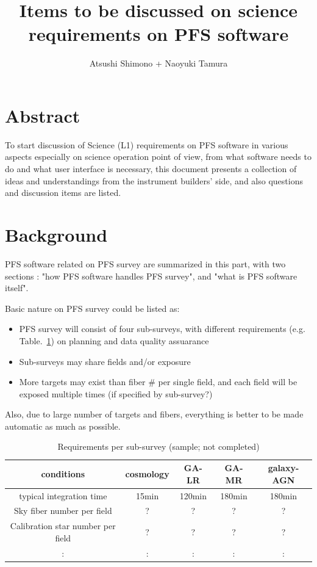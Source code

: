 \documentclass[a4paper,notitlepage]{article}
\title{Items to be discussed on science requirements on PFS software}
\author{Atsushi Shimono + Naoyuki Tamura}
\begin{document}

\ssnhead

\section{Abstract}

To start discussion of Science (L1) requirements on PFS software in 
various aspects especially on science operation point of view, from what 
software needs to do and what user interface is necessary, 
this document presents a collection of ideas and understandings from 
the instrument builders' side, and also questions and discussion items 
are listed. 


\section{Background}

PFS software related on PFS survey are summarized in this part, with two 
sections : "how PFS software handles PFS survey", and "what is PFS software 
itself". 

Basic nature on PFS survey could be listed as: 
\begin{itemize}
  \item PFS survey will consist of four sub-surveys, 
    with different requirements (e.g. Table.~\ref{tab:sciops-scireq-subsvy}) 
    on planning and data quality assuarance
  \item Sub-surveys may share fields and/or exposure
  \item More targets may exist than fiber \# per single field, 
    and each field will be exposed multiple times (if specified by sub-survey?)
\end{itemize}

Also, due to large number of targets and fibers, everything is better to be 
made automatic as much as possible. 

\begin{table}[htb]
\caption{Requirements per sub-survey (sample; not completed)}
\label{tab:sciops-scireq-subsvy}
\begin{center}
\begin{tabular}{c|c|c|c|c}
conditions & cosmology & GA-LR & GA-MR & galaxy-AGN \\
\hline
\hline
typical integration time & 15min & 120min & 180min & 180min \\
\hline
Sky fiber number per field & ? & ? & ? & ? \\
\hline
Calibration star number per field & ? & ? & ? & ? \\
\hline
 : & : & : & : & : \\
\end{tabular}
\end{center}
\end{table}
\end{document}
